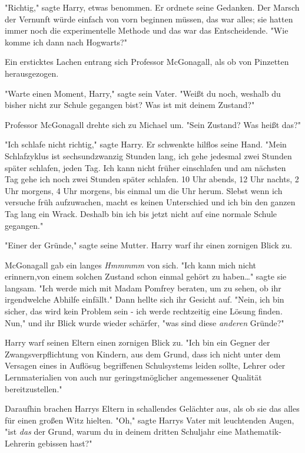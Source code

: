 {"Richtig," sagte Harry, etwas benommen. Er ordnete seine Gedanken. Der Marsch der Vernunft würde einfach von vorn beginnen müssen, das war alles; sie hatten immer noch die experimentelle Methode und das war das Entscheidende. "Wie komme ich dann nach Hogwarts?"

Ein ersticktes Lachen entrang sich Professor McGonagall, als ob von Pinzetten herausgezogen.

"Warte einen Moment, Harry," sagte sein Vater. "Weißt du noch, weshalb du bisher nicht zur Schule gegangen bist? Was ist mit deinem Zustand?"

Professor McGonagall drehte sich zu Michael um. "Sein Zustand? Was heißt das?"

"Ich schlafe nicht richtig," sagte Harry. Er schwenkte hilflos seine Hand. "Mein Schlafzyklus ist sechsundzwanzig Stunden lang, ich gehe jedesmal zwei Stunden später schlafen, jeden Tag. Ich kann nicht früher einschlafen und am nächsten Tag gehe ich noch zwei Stunden später schlafen. 10 Uhr abends, 12 Uhr nachts, 2 Uhr morgens, 4 Uhr morgens, bis einmal um die Uhr herum. Slebst wenn ich versuche früh aufzuwachen, macht es keinen Unterschied und ich bin den ganzen Tag lang ein Wrack. Deshalb bin ich bis jetzt nicht auf eine normale Schule gegangen."

"Einer der Gründe," sagte seine Mutter. Harry warf ihr einen zornigen Blick zu.

McGonagall gab ein langes \emph{Hmmmmm} von sich. "Ich kann mich nicht erinnern,von einem solchen Zustand schon einmal gehört zu haben…" sagte sie langsam. "Ich werde mich mit Madam Pomfrey beraten, um zu sehen, ob ihr irgendwelche Abhilfe einfällt." Dann hellte sich ihr Gesicht auf. "Nein, ich bin sicher, das wird kein Problem sein - ich werde rechtzeitig eine Lösung finden. Nun," und ihr Blick wurde wieder schärfer, "was sind diese \emph{anderen} Gründe?"

Harry warf seinen Eltern einen zornigen Blick zu. "Ich bin ein Gegner der Zwangsverpflichtung von Kindern, aus dem Grund, dass ich nicht unter dem Versagen eines in Auflösug begriffenen Schulsystems leiden sollte, Lehrer oder Lernmaterialien von auch nur geringstmöglicher angemessener Qualität bereitzustellen."

Daraufhin brachen Harrys Eltern in schallendes Gelächter aus, als ob sie das alles für einen großen Witz hielten. "Oh," sagte Harrys Vater mit leuchtenden Augen, "ist \emph{das} der Grund, warum du in deinem dritten Schuljahr eine Mathematik-Lehrerin gebissen hast?"

}
